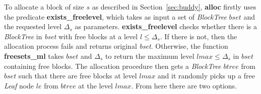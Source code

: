 %
%


To allocate a block of size $s$ as described in Section~\ref{sec:buddy}, \textbf{alloc} firstly uses the predicate \textbf{exists\_freelevel}, which takes as input a set of \emph{BlockTree} $bset$ and the requested level $\Delta_s$ as parameters. \textbf{exists\_freelevel} checks whether there is a \emph{BlockTree} in \emph{bset} with free blocks at a level $l \leq \Delta_s$. If there is not, then the allocation process fails and returns original \emph{bset}. Otherwise, the function \textbf{freesets\_ml} takes $bset$ and $\Delta_s$ to return the maximum level $lmax \leq \Delta_s$ in $bset$ containing free blocks. The allocation procedure then gets a \emph{BlockTree} $btree$ from $bset$ such that there are free blocks at level $lmax$ and it randomly picks up a free \emph{Leaf} node $le$ from $btree$ at the level $lmax$. From here there are two options.


